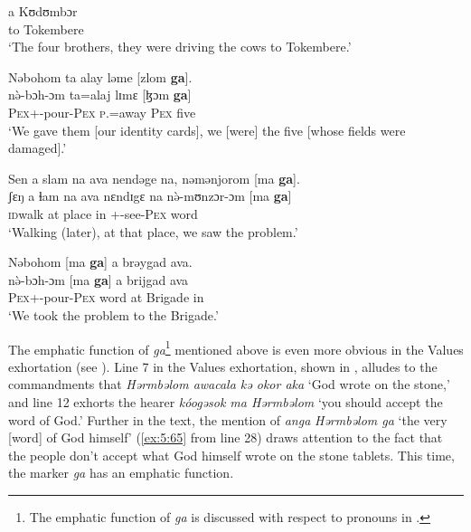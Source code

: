       \medskip
\gll a     Kʊdʊmbɔr\\
     to    Tokembere\\
\glt  ‘The four brothers, they were driving the cows to Tokembere.’ 
\z

\ea \label{ex:5:60}
Nəbohom  ta  alay  ləme  [zlom  \textbf{ga}].\\
\gll  n\`{ə}-bɔh-ɔm      ta=alaj  lɪmɛ  [ɮɔm   \textbf{ga}]\\
      {\oneS}\textsc{Pex}+{\PFV}-pour-\textsc{Pex}  \textsc{p}.{\DO}=away  \textsc{Pex}   five  {\ADJ}\\
\glt  ‘We gave them [our identity cards], we [were] the five [whose fields were damaged].’ 
\z

\ea \label{ex:5:61}
Sen  a slam  na  ava  nendəge  na,  nəmənjorom  [ma  \textbf{ga}].\\
\gll  ʃɛŋ     a   ɬam   na  ava   nɛndɪgɛ  na  n\`{ə}-mʊnzɔr-ɔm    [ma     \textbf{ga}]\\
 \textsc{id}walk  at  place   {\PSP}  in   {\DEM}   {\PSP}   {\oneS}+{\PFV}-see-\textsc{Pex}   word   {\ADJ}\\
\glt ‘Walking (later), at that place, we saw the problem.’
\z

\ea \label{ex:5:62}
Nəbohom  [ma  \textbf{ga}]  a  brəygad  ava.\\
\gll  n\`{ə}-bɔh-ɔm      [ma  \textbf{ga}]  a  brijgad  ava\\
      {\oneS}\textsc{Pex}+{\PFV}-pour-\textsc{Pex}    word  {\ADJ}   at   Brigade  in\\
\glt  ‘We took the problem to the Brigade.’
\z

The emphatic function of \textit{ga}\footnote{The emphatic function of \textit{ga} is discussed with respect to pronouns in .} mentioned above is even more obvious in the Values exhortation (see ). Line 7 in the Values exhortation, shown in , alludes to the commandments that \textit{Hərmbəlom  awacala  kə  okor  aka} ‘God wrote on the stone,’ and line 12  exhorts the hearer \textit{kóogəsok ma  Hərmbəlom} ‘you should accept the word of God.’ Further in the text, the mention of \textit{anga} \textit{Hərmbəlom ga } ‘the very [word] of God himself’ (\ref{ex:5:65} from line 28) draws attention to the fact that the people don’t accept what God himself wrote on the stone tablets. This time, the marker \textit{ga}  has an emphatic function. 

